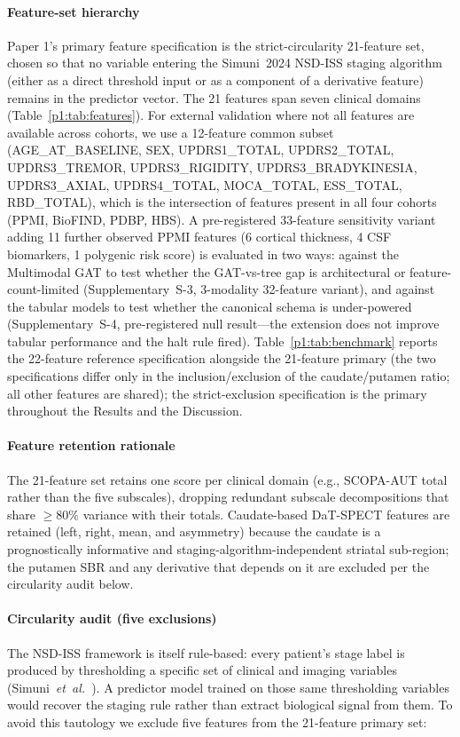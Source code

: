 \documentclass[10pt,letterpaper]{article}
\newcommand{\eg}{e.g.}
\begin{document}
\paragraph*{Feature-set hierarchy} Paper 1's primary feature specification is the strict-circularity 21-feature set, chosen so that no variable entering the Simuni~2024 NSD-ISS staging algorithm (either as a direct threshold input or as a component of a derivative feature) remains in the predictor vector. The 21 features span seven clinical domains (Table~\ref{p1:tab:features}). For external validation where not all features are available across cohorts, we use a 12-feature common subset (AGE\_AT\_BASELINE, SEX, UPDRS1\_TOTAL, UPDRS2\_TOTAL, UPDRS3\_TREMOR, UPDRS3\_RIGIDITY, UPDRS3\_BRADYKINESIA, UPDRS3\_AXIAL, UPDRS4\_TOTAL, MOCA\_TOTAL, ESS\_TOTAL, RBD\_TOTAL), which is the intersection of features present in all four cohorts (PPMI, BioFIND, PDBP, HBS). A pre-registered 33-feature sensitivity variant adding 11 further observed PPMI features (6 cortical thickness, 4 CSF biomarkers, 1 polygenic risk score) is evaluated in two ways: against the Multimodal GAT to test whether the GAT-vs-tree gap is architectural or feature-count-limited (Supplementary~S-3, 3-modality 32-feature variant), and against the tabular models to test whether the canonical schema is under-powered (Supplementary~S-4, pre-registered null result---the extension does not improve tabular performance and the halt rule fired). Table~\ref{p1:tab:benchmark} reports the 22-feature reference specification alongside the 21-feature primary (the two specifications differ only in the inclusion/exclusion of the caudate/putamen ratio; all other features are shared); the strict-exclusion specification is the primary throughout the Results and the Discussion.

\paragraph*{Feature retention rationale} The 21-feature set retains one score per clinical domain (\eg, SCOPA-AUT total rather than the five subscales), dropping redundant subscale decompositions that share $\geq 80\%$ variance with their totals. Caudate-based DaT-SPECT features are retained (left, right, mean, and asymmetry) because the caudate is a prognostically informative and staging-algorithm-independent striatal sub-region; the putamen SBR and any derivative that depends on it are excluded per the circularity audit below.

\paragraph*{Circularity audit (five exclusions)}
\label{p1:sec:methods:circularity-audit}
The NSD-ISS framework is itself rule-based: every patient's stage label is produced by thresholding a specific set of clinical and imaging variables (Simuni~\textit{et~al.}~\cite{simuni2024}). A predictor model trained on those same thresholding variables would recover the staging rule rather than extract biological signal from them. To avoid this tautology we exclude five features from the 21-feature primary set:
\end{document}
